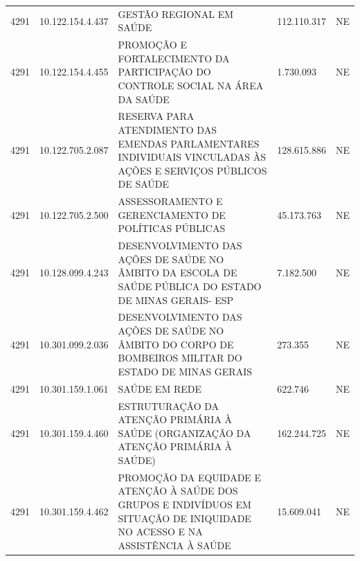\documentclass{article}
\begin{document}
\begin{longtable}[c]{m{1cm}|m{2cm}|m{10cm}|m{2cm}|m{1cm}}
\multicolumn{1}{C{1cm}|}{4291} & \multicolumn{1}{C{2cm}|}{10.122.154.4.437} & \multicolumn{1}{L{10cm}|}{GESTÃO REGIONAL EM SAÚDE} & \multicolumn{1}{R{2cm}|}{112.110.317} & \multicolumn{1}{C{1cm}}{NE} \\
\multicolumn{1}{C{1cm}|}{4291} & \multicolumn{1}{C{2cm}|}{10.122.154.4.455} & \multicolumn{1}{L{10cm}|}{PROMOÇÃO E FORTALECIMENTO DA PARTICIPAÇÃO DO CONTROLE SOCIAL NA ÁREA DA SAÚDE} & \multicolumn{1}{R{2cm}|}{1.730.093} & \multicolumn{1}{C{1cm}}{NE} \\
\multicolumn{1}{C{1cm}|}{4291} & \multicolumn{1}{C{2cm}|}{10.122.705.2.087} & \multicolumn{1}{L{10cm}|}{RESERVA PARA ATENDIMENTO DAS EMENDAS PARLAMENTARES INDIVIDUAIS VINCULADAS ÀS AÇÕES E SERVIÇOS PÚBLICOS DE SAÚDE} & \multicolumn{1}{R{2cm}|}{128.615.886} & \multicolumn{1}{C{1cm}}{NE} \\
\multicolumn{1}{C{1cm}|}{4291} & \multicolumn{1}{C{2cm}|}{10.122.705.2.500} & \multicolumn{1}{L{10cm}|}{ASSESSORAMENTO E GERENCIAMENTO DE POLÍTICAS PÚBLICAS} & \multicolumn{1}{R{2cm}|}{45.173.763} & \multicolumn{1}{C{1cm}}{NE} \\
\multicolumn{1}{C{1cm}|}{4291} & \multicolumn{1}{C{2cm}|}{10.128.099.4.243} & \multicolumn{1}{L{10cm}|}{DESENVOLVIMENTO DAS AÇÕES DE SAÚDE NO ÂMBITO DA ESCOLA DE SAÚDE PÚBLICA DO ESTADO DE MINAS GERAIS- ESP} & \multicolumn{1}{R{2cm}|}{7.182.500} & \multicolumn{1}{C{1cm}}{NE} \\
\multicolumn{1}{C{1cm}|}{4291} & \multicolumn{1}{C{2cm}|}{10.301.099.2.036} & \multicolumn{1}{L{10cm}|}{DESENVOLVIMENTO DAS AÇÕES DE SAÚDE NO ÂMBITO DO CORPO DE BOMBEIROS MILITAR DO ESTADO DE MINAS GERAIS} & \multicolumn{1}{R{2cm}|}{273.355} & \multicolumn{1}{C{1cm}}{NE} \\
\multicolumn{1}{C{1cm}|}{4291} & \multicolumn{1}{C{2cm}|}{10.301.159.1.061} & \multicolumn{1}{L{10cm}|}{SAÚDE EM REDE} & \multicolumn{1}{R{2cm}|}{622.746} & \multicolumn{1}{C{1cm}}{NE} \\
\multicolumn{1}{C{1cm}|}{4291} & \multicolumn{1}{C{2cm}|}{10.301.159.4.460} & \multicolumn{1}{L{10cm}|}{ESTRUTURAÇÃO DA ATENÇÃO PRIMÁRIA À SAÚDE (ORGANIZAÇÃO DA ATENÇÃO PRIMÁRIA À SAÚDE)} & \multicolumn{1}{R{2cm}|}{162.244.725} & \multicolumn{1}{C{1cm}}{NE} \\
\multicolumn{1}{C{1cm}|}{4291} & \multicolumn{1}{C{2cm}|}{10.301.159.4.462} & \multicolumn{1}{L{10cm}|}{PROMOÇÃO DA EQUIDADE E ATENÇÃO À SAÚDE DOS GRUPOS E INDIVÍDUOS EM SITUAÇÃO DE INIQUIDADE NO ACESSO E NA ASSISTÊNCIA À SAÚDE} & \multicolumn{1}{R{2cm}|}{15.609.041} & \multicolumn{1}{C{1cm}}{NE} \\

\end{longtable}
\end{document}
